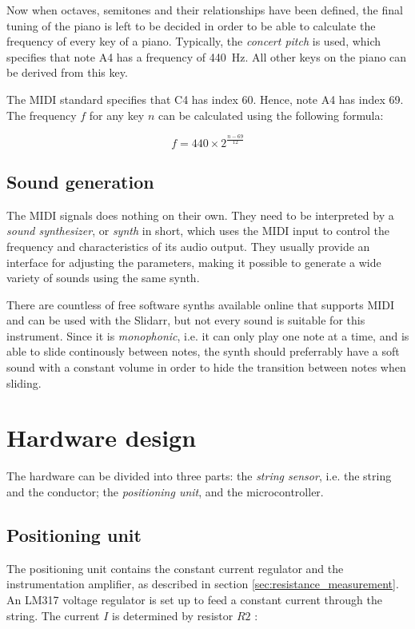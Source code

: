 \documentclass{article}
\begin{document}
Now when octaves, semitones and their relationships have been defined, the final tuning of the piano is left to be decided in order to be able to calculate the frequency of every key of a piano. Typically, the \textit{concert pitch} is used, which specifies that note A4 has a frequency of \SI{440}{\hertz}. All other keys on the piano can be derived from this key.

The MIDI standard specifies that C4 has index 60. Hence, note A4 has index 69. The frequency $f$ for any key $n$ can be calculated using the following formula:

$$ f = 440 \times 2^{\frac{n-69}{12}} $$

\subsection{Sound generation}
The MIDI signals does nothing on their own. They need to be interpreted by a \textit{sound synthesizer}, or \textit{synth} in short, which uses the MIDI input to control the frequency and characteristics of its audio output. They usually provide an interface for adjusting the parameters, making it possible to generate a wide variety of sounds using the same synth. 

There are countless of free software synths available online that supports MIDI and can be used with the Slidarr, but not every sound is suitable for this instrument. Since it is \textit{monophonic}, i.e. it can only play one note at a time, and is able to slide continously between notes, the synth should preferrably have a soft sound with a constant volume in order to hide the transition between notes when sliding.

\section{Hardware design}


The hardware can be divided into three parts: the \textit{string sensor}, i.e. the string and the conductor; the \textit{positioning unit}, and the microcontroller.

\subsection{Positioning unit}
The positioning unit contains the constant current regulator and the instrumentation amplifier, as described in section \ref{sec:resistance_measurement}. An LM317 voltage regulator is set up to feed a constant current through the string. The current $I$ is determined by resistor $R2$ \cite{lm317}:
\end{document}
